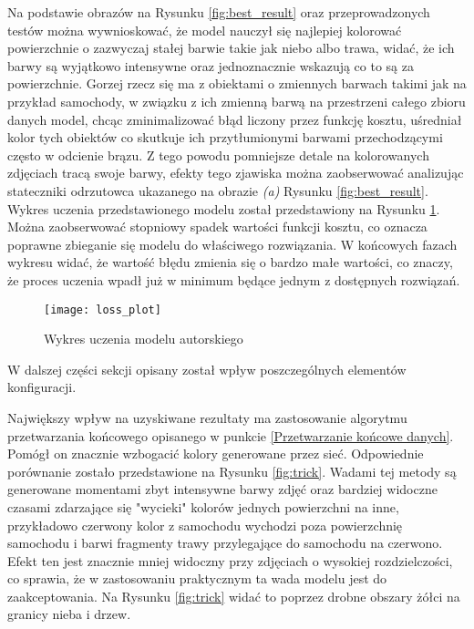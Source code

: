  \noindent
 Na podstawie obrazów na Rysunku \ref{fig:best_result} oraz przeprowadzonych
 testów można wywnioskować, że model nauczył się najlepiej kolorować powierzchnie
 o zazwyczaj stałej barwie takie jak niebo albo trawa, widać, że ich barwy są
 wyjątkowo intensywne oraz jednoznacznie wskazują co to są za powierzchnie.
 Gorzej rzecz się ma z obiektami o zmiennych barwach takimi jak na przykład
 samochody, w związku z ich zmienną barwą na przestrzeni całego zbioru danych
 model, chcąc zminimalizować błąd liczony przez funkcję kosztu, uśredniał kolor
 tych obiektów co skutkuje ich przytłumionymi barwami przechodzącymi często
 w odcienie brązu. Z tego powodu pomniejsze detale na kolorowanych zdjęciach
 tracą swoje barwy, efekty tego zjawiska można zaobserwować analizując
 stateczniki odrzutowca ukazanego na obrazie \textit{(a)} Rysunku \ref{fig:best_result}.
 Wykres uczenia przedstawionego modelu został przedstawiony na Rysunku
 \ref{fig:loss_plot}. Można zaobserwować stopniowy spadek wartości funkcji
 kosztu, co oznacza poprawne zbieganie się modelu do właściwego rozwiązania.
 W końcowych fazach wykresu widać, że wartość błędu zmienia się o bardzo
 małe wartości, co znaczy, że proces uczenia wpadł już w minimum będące
 jednym z dostępnych rozwiązań.

 \begin{figure}[h]
  \centering
  \captionsetup{justification=centering}
  \texttt{[image: loss\_plot]}
  \caption[Wykres uczenia modelu autorskiego - źródło: Rysunek własny]
  {Wykres uczenia modelu autorskiego}
  \label{fig:loss_plot}
 \end{figure}

  \noindent
  W dalszej części sekcji opisany został wpływ poszczególnych elementów konfiguracji.

  Największy wpływ na uzyskiwane rezultaty ma zastosowanie algorytmu przetwarzania
  końcowego opisanego w punkcie \ref{Przetwarzanie końcowe danych}. Pomógł on
  znacznie wzbogacić kolory generowane przez sieć. Odpowiednie porównanie
  zostało przedstawione na Rysunku \ref{fig:trick}. Wadami tej metody są generowane
  momentami zbyt intensywne barwy zdjęć oraz bardziej widoczne czasami
  zdarzające się "wycieki"
  kolorów jednych powierzchni na inne, przykładowo czerwony kolor z samochodu
  wychodzi poza powierzchnię samochodu i barwi fragmenty trawy przylegające do
  samochodu na czerwono. Efekt ten jest znacznie mniej widoczny przy zdjęciach
  o wysokiej rozdzielczości, co sprawia, że w zastosowaniu praktycznym ta
  wada modelu jest do zaakceptowania. Na Rysunku \ref{fig:trick} widać to
  poprzez drobne obszary żółci na granicy nieba i drzew.

